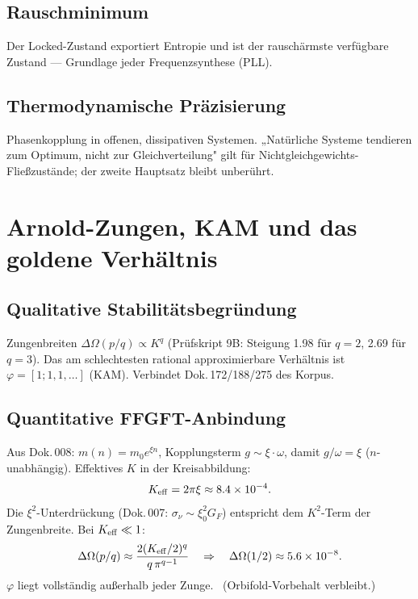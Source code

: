 \subsection{Rauschminimum}
Der Locked-Zustand exportiert Entropie und ist der rauschärmste verfügbare Zustand —
Grundlage jeder Frequenzsynthese (PLL).

\subsection{Thermodynamische Präzisierung}
Phasenkopplung in offenen, dissipativen Systemen. „Natürliche Systeme tendieren
zum Optimum, nicht zur Gleichverteilung" gilt für Nichtgleichgewichts-Fließ\-zustände;
der zweite Hauptsatz bleibt unberührt.

\section{Arnold-Zungen, KAM und das goldene Verhältnis}

\subsection{Qualitative Stabilitätsbegründung \E}
Zungenbreiten $\Delta\Omega(p/q) \propto K^q$ (Prüfskript 9B: Steigung 1.98 für
$q=2$, 2.69 für $q=3$). Das am schlechtesten rational approximierbare Verhältnis
ist $\varphi = [1;1,1,\ldots]$ (KAM). Verbindet Dok.\,172/188/275 des Korpus.

\subsection{Quantitative FFGFT-Anbindung \K}
Aus Dok.\,008: $m(n) = m_0 e^{\xi n}$, Kopplungsterm $g \sim \xi\cdot\omega$,
damit $g/\omega = \xi$ ($n$-unabhängig). Effektives $K$ in der Kreisabbildung:
\begin{equation}
  K_{\mathrm{eff}} = 2\pi\xi \approx 8.4\times10^{-4}.
\end{equation}
Die $\xi^2$-Unterdrückung (Dok.\,007: $\sigma_\nu \sim \xi_0^2 G_F$) entspricht dem
$K^2$-Term der Zungenbreite. Bei $K_{\mathrm{eff}} \ll 1$:
\begin{equation}
  \Delta\Omega(p/q) \approx \frac{2(K_{\rm eff}/2)^q}{q\,\pi^{q-1}}
  \quad\Rightarrow\quad
  \Delta\Omega(1/2) \approx 5.6\times10^{-8}.
\end{equation}
$\varphi$ liegt vollständig außerhalb jeder Zunge. \K\ (Orbifold-Vorbehalt
verbleibt.)

